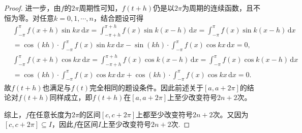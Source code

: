 \documentclass[../../main.tex]{subfiles}%
\begin{document}
\begin{proof}
进一步，由$f$的$2\pi$周期性可知，$f(t+ h)$仍是以$2\pi$为周期的连续函数，且不恒为零。对任意$k=0,1,\cdots,n$，结合题设可得
\begin{align*}
&\int_{-\pi}^{\pi}{f\left( x+h \right) \sin kx\,\mathrm{d}x}=\int_{-\pi +h}^{\pi +h}{f\left( x \right) \sin k\left( x-h \right) \,\mathrm{d}x}=\int_{-\pi}^{\pi}{f\left( x \right) \sin k\left( x-h \right) \,\mathrm{d}x}
\\
&=\cos \left( kh \right) \cdot \int_{-\pi}^{\pi}{f\left( x \right) \sin kx\,\mathrm{d}x}-\sin \left( kh \right) \cdot \int_{-\pi}^{\pi}{f\left( x \right) \cos kx\,\mathrm{d}x}=0,
\end{align*}
\begin{align*}
&\int_{-\pi}^{\pi}{f\left( x+h \right) \cos kx\,\mathrm{d}x}=\int_{-\pi +h}^{\pi +h}{f\left( x \right) \cos k\left( x-h \right) \,\mathrm{d}x}=\int_{-\pi}^{\pi}{f\left( x \right) \cos k\left( x-h \right) \,\mathrm{d}x}
\\
&=\cos \left( kh \right) \cdot \int_{-\pi}^{\pi}{f\left( x \right) \cos kx\,\mathrm{d}x}+\cos \left( kh \right) \cdot \int_{-\pi}^{\pi}{f\left( x \right) \cos kx\,\mathrm{d}x}=0.
\end{align*}
故$f(t+h)$也满足与$f(t)$完全相同的题设条件。因此前述关于$[a, a+2\pi]$的结论对$f(t + h)$同样成立，即$f(t+h)$在$[a, a+2\pi]$上至少改变符号$2n+2$次。

综上，$f$在任意长度为$2\pi$的区间$[c, c+2\pi]$上都至少改变符号$2n+2$次。又因为$[c, c+2\pi] \subseteq I$，因此$f$在区间$I$上至少改变符号$2n+2$次.
\end{proof}
\end{document}
